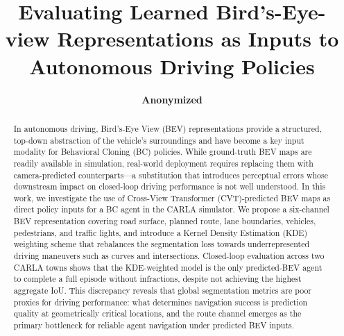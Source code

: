 \documentclass[12pt]{article}
\title{
Evaluating Learned Bird’s-Eye-view Representations as Inputs to Autonomous Driving Policies
}
\author{
\textbf{Anonymized}
}
\begin{document}
%
%
%
\maketitle              %
%

%
\begin{abstract}
In autonomous driving, Bird's-Eye View (BEV) representations provide a structured, top-down abstraction of the vehicle's surroundings and have become a key input modality for Behavioral Cloning (BC) policies. While ground-truth BEV maps are readily available in simulation, real-world deployment requires replacing them with camera-predicted counterparts—a substitution that introduces perceptual errors whose downstream impact on closed-loop driving performance is not well understood. In this work, we investigate the use of Cross-View Transformer (CVT)-predicted BEV maps as direct policy inputs for a BC agent in the CARLA simulator. We propose a six-channel BEV representation covering road surface, planned route, lane boundaries, vehicles, pedestrians, and traffic lights, and introduce a Kernel Density Estimation (KDE) weighting scheme that rebalances the segmentation loss towards underrepresented driving maneuvers such as curves and intersections. Closed-loop evaluation across two CARLA towns shows that the KDE-weighted model is the only predicted-BEV agent to complete a full episode without infractions, despite not achieving the highest aggregate IoU. This discrepancy reveals that global segmentation metrics are poor proxies for driving performance: what determines navigation success is prediction quality at geometrically critical locations, and the route channel emerges as the primary bottleneck for reliable agent navigation under predicted BEV inputs.

\end{abstract}
%
%
%
%
%
%
\end{document}
